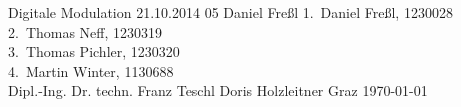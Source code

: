 \TUHeader                          %
{Digitale Modulation}                       %
{21.10.2014}                        %
{05}                            %
{Daniel Freßl}      %
{
1.~Daniel Freßl, 1230028\\
2.~Thomas Neff, 1230319\\                    
3.~Thomas Pichler, 1230320 \\ 
4.~Martin Winter, 1130688 \\                  %
}
{Dipl.-Ing. Dr. techn. Franz Teschl}
{Doris Holzleitner}                          %
{Graz}                              %
{\today}                            %




\pagebreak
  
\tableofcontents
  
\pagebreak